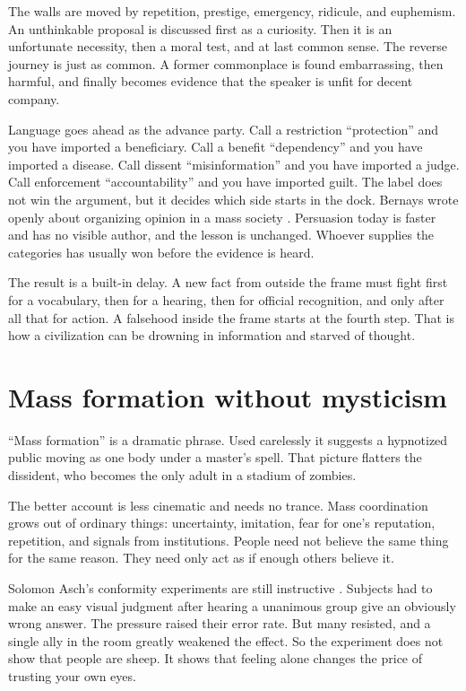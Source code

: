 \documentclass[12pt,a4paper]{book}
\begin{document}
The walls are moved by repetition, prestige, emergency, ridicule, and euphemism. An unthinkable proposal is discussed first as a curiosity. Then it is an unfortunate necessity, then a moral test, and at last common sense. The reverse journey is just as common. A former commonplace is found embarrassing, then harmful, and finally becomes evidence that the speaker is unfit for decent company.

Language goes ahead as the advance party. Call a restriction ``protection'' and you have imported a beneficiary. Call a benefit ``dependency'' and you have imported a disease. Call dissent ``misinformation'' and you have imported a judge. Call enforcement ``accountability'' and you have imported guilt. The label does not win the argument, but it decides which side starts in the dock. Bernays wrote openly about organizing opinion in a mass society \cite{bernais-propaganda}. Persuasion today is faster and has no visible author, and the lesson is unchanged. Whoever supplies the categories has usually won before the evidence is heard.

The result is a built-in delay. A new fact from outside the frame must fight first for a vocabulary, then for a hearing, then for official recognition, and only after all that for action. A falsehood inside the frame starts at the fourth step. That is how a civilization can be drowning in information and starved of thought.

\section{Mass formation without mysticism}

``Mass formation'' is a dramatic phrase. Used carelessly it suggests a hypnotized public moving as one body under a master's spell. That picture flatters the dissident, who becomes the only adult in a stadium of zombies.

The better account is less cinematic and needs no trance. Mass coordination grows out of ordinary things: uncertainty, imitation, fear for one's reputation, repetition, and signals from institutions. People need not believe the same thing for the same reason. They need only act as if enough others believe it.

Solomon Asch's conformity experiments are still instructive \cite{Asch1956}. Subjects had to make an easy visual judgment after hearing a unanimous group give an obviously wrong answer. The pressure raised their error rate. But many resisted, and a single ally in the room greatly weakened the effect. So the experiment does not show that people are sheep. It shows that feeling alone changes the price of trusting your own eyes.
\end{document}
